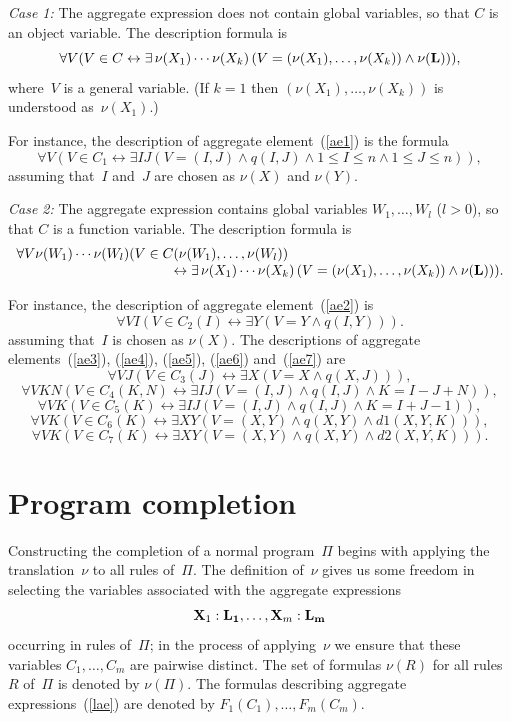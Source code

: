 \documentclass[11pt]{article}
\def\lrar{\leftrightarrow}
\def\beq{\begin{equation}}
\def\eeq#1{\label{#1}\end{equation}}
\def\ba{\begin{array}}
\def\ea{\end{array}}
\def\bfx{{\bf X}}
\begin{document}
\begin{adjustwidth}{-1cm}{-1cm}
\medskip\noindent\emph{Case 1:} The aggregate expression does not contain
global variables, so that $C$ is an object variable.  The description
formula is
$$\forall V(V\in C\lrar\exists\, \nu(X_1)\cdots\nu(X_k)\,
(V=(\nu(X_1),\dots,\nu(X_k))
\land \nu({\bf L}))),$$
where~$V$ is a general variable.
(If $k=1$ then $(\nu(X_1),\dots,\nu(X_k))$ is understood as~$\nu(X_1)$.)

For instance, the description of aggregate element~(\ref{ae1}) is the formula
\beq
\forall V(V\in C_1 \lrar \exists IJ(V=(I,J)\land q(I,J) \land 1\leq I\leq n
\land 1\leq J\leq n)),
\eeq{d1}
assuming that~$I$ and~$J$ are chosen as $\nu(X)$ and $\nu(Y)$.

\medskip\noindent\emph{Case 2:} The aggregate expression contains
global variables $W_1,\dots,W_l$ ($l>0$), so that $C$ is a function
variable.  The description formula is
\begin{equation}
\ba l
\forall V \nu(W_1) \cdots \nu(W_l)(V\in C(\nu(W_1),\dots,\nu(W_l))\\
\hskip 4cm\lrar
\exists\, \nu(X_1)\cdots\nu(X_k)\,(V=(\nu(X_1),\dots,\nu(X_k))
\land \nu({\bf L}))).
\ea
  \label{eq:descr2}
\end{equation}

For instance, the description of aggregate element~(\ref{ae2}) is
 \beq
 \forall V I(V\in C_2(I) \lrar \exists Y( V=Y \land q(I,Y))).
\eeq{d2}
assuming that~$I$ is chosen as $\nu(X)$.  The descriptions of aggregate
elements~(\ref{ae3}), (\ref{ae4}), (\ref{ae5}), (\ref{ae6}) and~(\ref{ae7})
are
\beq
\forall V J(V\in C_3(J) \lrar \exists X( V=X \land q(X,J))),
\eeq{d3}
\beq
\forall VKN(V\in C_4(K,N) \lrar \exists IJ(V=(I,J) \land q(I,J)
   \land K=I-J+N)),
\eeq{d4}
\beq
\forall VK(V\in C_5(K) \lrar \exists IJ(V=(I,J) \land q(I,J)
   \land K=I+J-1)),
\eeq{d5}
\beq
\forall VK(V\in C_6(K) \lrar \exists XY(V=(X,Y) \land q(X,Y) \land d1(X,Y,K))),
\eeq{d6}
\beq
\forall VK(V\in C_7(K) \lrar \exists XY(V=(X,Y) \land q(X,Y) \land d2(X,Y,K))).
\eeq{d7}

\section{Program completion}

Constructing the completion of a normal program~$\Pi$ begins with applying
the translation~$\nu$ to all rules of~$\Pi$.  The definition
of~$\nu$ gives us some freedom in selecting the variables associated with the 
aggregate expressions
\beq
\bfx_1:{\bf L_1},\dots,\bfx_m:{\bf L_m}
\eeq{lae}
occurring in rules of~$\Pi$; in the process of applying~$\nu$ we ensure
that these variables $C_1,\dots,C_m$ are pairwise distinct.  The set
of formulas $\nu(R)$ for all rules~$R$ of~$\Pi$ is denoted by $\nu(\Pi)$.
The formulas describing aggregate expressions~(\ref{lae}) are denoted by
$F_1(C_1),\dots,F_m(C_m)$.


\end{adjustwidth}
\end{document}
